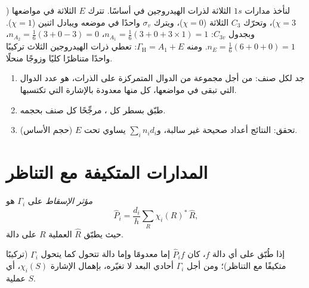 \begin{example}\label{ex:b3:group-theory-applied:nh3}
لنأخذ مدارات $1s$ الثلاثة لذرات الهيدروجين في  أساسًا. تترك $E$
الثلاثة في مواضعها ($\chi = 3$)، وتحرّك $C_3$ الثلاثة ($\chi = 0$)، ويترك
$\sigma_v$ واحدًا في موضعه ويبادل اثنين ($\chi = 1$). وبجدول $C_{3v}$:
$n_{A_1} = \frac16(3 + 0 + 3\times1) = 1$، $n_{A_2} = \frac16(3 + 0 - 3) = 0$،
$n_E = \frac16(6 + 0 + 0) = 1$. ومنه $\Gamma_{\mathrm H} = A_1 + E$: تعطي ذرات الهيدروجين
الثلاث تركيبًا واحدًا متناظرًا كليًا وزوجًا منحلًا.
\end{example}

\begin{method}\label{met:b3:group-theory-applied:reduce}
\begin{enumerate}
  \item جد  لكل صنف: من أجل مجموعة من الدوال المتمركزة على
        الذرات، هو عدد الدوال التي تبقى في مواضعها، كل منها معدودة
        بالإشارة التي تكتسبها.
  \item طبّق  بسطر كل ، مرجِّحًا كل صنف بحجمه.
  \item تحقق: النتائج أعداد صحيحة غير سالبة، و$\sum_in_id_i$
        يساوي  تحت $E$ (حجم الأساس).
\end{enumerate}
\end{method}

\section{المدارات المتكيفة مع التناظر}

\begin{definition}\label{def:b3:group-theory-applied:projection}
\emph{مؤثر الإسقاط} على  $\Gamma_i$ هو
\[
\hat P_i = \frac{d_i}{h}\sum_R\chi_i(R)^*\,\hat R,
\]
حيث يطبّق $\hat R$ العملية $R$ على دالة.
\end{definition}

\begin{proposition}\label{prop:b3:group-theory-applied:projection}
إذا طُبّق على أي دالة $f$، كان $\hat P_if$ إما معدومًا وإما دالة
تتحول كما يتحول $\Gamma_i$ (تركيبًا متكيفًا مع التناظر)؛ ومن أجل $\Gamma_i$
أحادي البعد لا تغيّره، بإهمال الإشارة $\chi_i(S)$، أي
عملية $S$.
\end{proposition}

